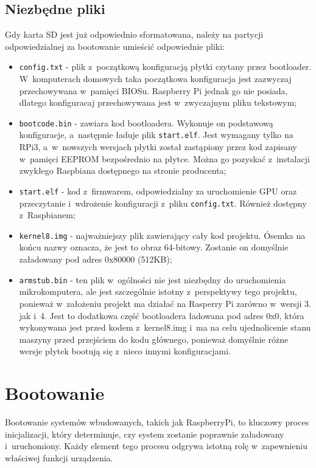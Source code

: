 \documentclass[shortabstract]{iithesis}
\begin{document}
\subsection{Niezbędne pliki}
Gdy karta SD jest już odpowiednio sformatowana, należy na partycji odpowiedzialnej za bootowanie umieścić odpowiednie pliki:
\begin{itemize}
 \item \texttt{config.txt}  - plik z~początkową konfiguracją płytki czytany przez bootloader. W~komputerach domowych taka początkowa konfiguracja jest zazwyczaj przechowywana w~pamięci BIOSu. Raspberry Pi jednak go nie posiada, dlatego konfiguracaj przechowywana jest w~zwyczajnym pliku tekstowym;
 \item \texttt{bootcode.bin}  - zawiara kod bootloadera. Wykonuje on podstawową konfiguracje, a~następnie ładuje plik \texttt{start.elf}. Jest wymagany tylko na RPi3, a~w~nowszych wersjach płytki został zastąpiony przez kod zapisany w~pamięci EEPROM bezpośrednio na płytce. Można go pozyskać z~instalacji zwykłego Raspbiana dostępnego na stronie producenta;
 \item \texttt{start.elf}  - kod z~firmwarem, odpowiedzialny za uruchomienie GPU oraz przeczytanie i~wdrożenie konfiguracji z~pliku \texttt{config.txt}. Również dostępny z~Raspbianem;
 \item \texttt{kernel8.img}  - najważniejszy plik zawierający cały kod projektu. Ósemka na końcu nazwy oznacza, że jest to obraz 64-bitowy. Zostanie on domyślnie załadowany pod adres 0x80000 (512KB);
 \item \texttt{armstub.bin}  - ten plik w~ogólności nie jest niezbędny do uruchomienia mikrokomputera, ale jest szczególnie istotny z~perspektywy tego projektu, ponieważ w~założeniu projekt ma działać na Rasperry Pi zarówno w~wersji 3. jak i~4. Jest to dodatkowa część bootloadera ładowana pod adres 0x0, która wykonywana jest przed kodem z~kernel8.img i~ma na celu ujednolicenie stanu maszyny przed przejściem do kodu głównego, ponieważ domyślnie różne wersje płytek bootują się z~nieco innymi konfiguracjami.
\end{itemize}

\section{Bootowanie}
Bootowanie systemów wbudowanych, takich jak RaspberryPi, to kluczowy proces inicjalizacji, który determinuje, czy system zostanie poprawnie załadowany i~uruchomiony. Każdy element tego procesu odgrywa istotną rolę w~zapewnieniu właściwej funkcji urządzenia.
\end{document}
